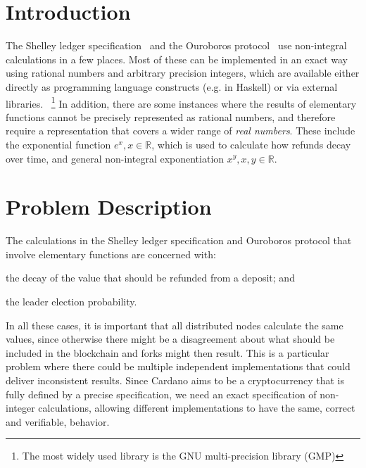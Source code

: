 \documentclass[11pt,a4paper,dvipsnames,twosided]{article}
\newcommand{\khcomment}[1]{\todo[color=blue!20]{KH: #1}}
\theoremstyle{definition}
\theoremstyle{definition}
\begin{document}
\tableofcontents
\listoffigures

\section{Introduction}
\label{sec:introduction}

The Shelley ledger specification~\cite{shelley_spec} and the Ouroboros
protocol~\cite{ouroboros} use non-integral calculations in a few places. Most of
these can be implemented in an exact way using rational numbers and arbitrary
precision integers, which are available either directly as programming language
constructs (e.g. in Haskell) or via external libraries.~ \footnote{The most
  widely used library is the GNU multi-precision library (GMP)}
%
In addition, there are some instances where the results of elementary functions
cannot be precisely represented as rational numbers, and therefore require a
representation that covers a wider range of \emph{real numbers}.  These include
the exponential function $e^{x}, x \in \mathbb{R}$, which is used to calculate
how refunds decay over time, and general non-integral exponentiation
$x^{y}, x, y \in \mathbb{R}$. %

\section{Problem Description}
\label{sec:problem-description}

The calculations in the Shelley ledger specification and Ouroboros protocol that involve elementary functions are concerned with:
\begin{inparaenum}
\item
  the decay of the value that should be refunded from a deposit;
and
\item
  the leader election probability.
\end{inparaenum}
%
In all these cases, it is important that all distributed nodes calculate the
same values, since otherwise there might be a disagreement about what should be
included in the blockchain and forks might then result. This is a particular
problem where there could be multiple independent implementations that could
deliver inconsistent results.  Since Cardano aims to be a cryptocurrency that is
fully defined by a precise specification, we need an exact specification of
non-integer calculations, allowing different implementations to have the same,
correct and verifiable,
behavior.
\end{document}
